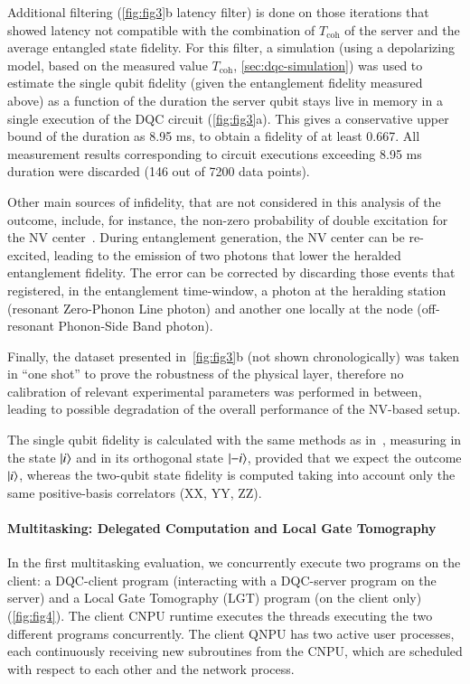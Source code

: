 Additional filtering (\cref{fig:fig3}b latency filter) is done on those iterations that showed latency not compatible with the combination of $T_{\text{coh}}$ of the server and the average entangled state fidelity. For this filter, a simulation (using a depolarizing model, based on the measured value $T_{\text{coh}}$, \cref{sec:dqc-simulation}) was used to estimate the single qubit fidelity (given the entanglement fidelity measured above) as a function of the duration the server qubit stays live in memory in a single execution of the DQC circuit (\cref{fig:fig3}a). This gives a conservative upper bound of the duration as 8.95 ms, to obtain a fidelity of at least 0.667. All measurement results corresponding to circuit executions exceeding 8.95 ms duration were discarded (146 out of 7200 data points). 

Other main sources of infidelity, that are not considered in this analysis of the outcome, include, for instance, the non-zero probability of double excitation for the NV center~\cite{hermans2023entangling}. During entanglement generation, the NV center can be re-excited, leading to the emission of two photons that lower the heralded entanglement fidelity. The error can be corrected by discarding those events that registered, in the entanglement time-window, a photon at the heralding station (resonant Zero-Phonon Line photon) and another one locally at the node (off-resonant Phonon-Side Band photon). 

Finally, the dataset presented in~\cref{fig:fig3}b (not shown chronologically) was taken in “one shot” to prove the robustness of the physical layer, therefore no calibration of relevant experimental parameters was performed in between, leading to possible degradation of the overall performance of the NV-based setup.

The single qubit fidelity is calculated with the same methods as in~\cite{iuliano2024qubit}, measuring in the state $\ket{i}$ and in its orthogonal state $\ket{-i}$, provided that we expect the outcome $\ket{i}$, whereas the two-qubit state fidelity is computed taking into account only the same positive-basis correlators (XX, YY, ZZ).

\paragraph{Multitasking: Delegated Computation and Local Gate Tomography}

In the first multitasking evaluation, we concurrently execute two programs on the client: a DQC-client program (interacting with a DQC-server program on the server) and a Local Gate Tomography (LGT) program (on the client only) (\cref{fig:fig4}). The client CNPU runtime executes the threads executing the two different programs concurrently. The client QNPU has two active user processes, each continuously receiving new subroutines from the CNPU, which are scheduled with respect to each other and the network process.

